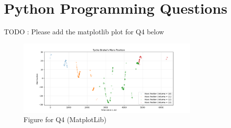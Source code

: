 \documentclass[12pt]{article}
\begin{document}
\section{Python Programming Questions}


TODO : Please add the matplotlib plot for Q4 below
\begin{figure}
  \centering
  \includegraphics[width=0.8\textwidth]{example-figure.png}
  \caption{Figure for Q4 (MatplotLib)}
\end{figure}
\end{document}
